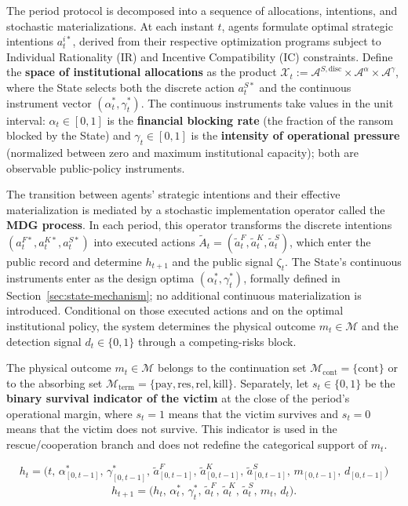 \documentclass[12pt,a4paper]{article}
\theoremstyle{plain}
\theoremstyle{definition}
\theoremstyle{remark}
\newcommand{\1}{\mathbf{1}}
\begin{document}
The period protocol is decomposed into a sequence of allocations, intentions, and
stochastic materializations. At each instant $t$, agents formulate optimal strategic
intentions $a_t^{i\ast}$, derived from their respective optimization programs subject
to Individual Rationality (IR) and Incentive Compatibility (IC) constraints. Define the
\textbf{space of institutional allocations} as the product
$\mathcal{X}_t:=\mathcal{A}^{S,\mathrm{disc}}\times\mathcal{A}^{\alpha}\times
\mathcal{A}^{\gamma}$, where the State selects both the discrete action
$a_t^{S\ast}$ and the continuous instrument vector
$(\alpha_t^\ast,\gamma_t^\ast)$. The continuous instruments take values in the unit
interval: $\alpha_t\in[0,1]$ is the \textbf{financial blocking rate} \textup{(the
fraction of the ransom blocked by the State)} and $\gamma_t\in[0,1]$ is the
\textbf{intensity of operational pressure} \textup{(normalized between zero and maximum
institutional capacity)}; both are observable public-policy instruments.

The transition between agents' strategic intentions and their effective materialization
is mediated by a stochastic implementation operator called the \textbf{MDG process}.
In each period, this operator transforms the discrete intentions
$(a_t^{F\ast},a_t^{K\ast},a_t^{S\ast})$ into executed actions
$\tilde{A}_t=(\tilde{a}_t^F,\tilde{a}_t^K,\tilde{a}_t^S)$, which enter the public
record and determine $h_{t+1}$ and the public signal $\zeta_t$. The State's continuous
instruments enter as the design optima $(\alpha_t^\ast,\gamma_t^\ast)$, formally
defined in Section~\ref{sec:state-mechanism}; no additional continuous materialization
is introduced. Conditional on those executed actions and on the optimal institutional
policy, the system determines the physical outcome $m_t\in\mathcal{M}$ and the
detection signal $d_t\in\{0,1\}$ through a competing-risks block.

The physical outcome $m_t\in\mathcal{M}$ belongs to the continuation set
$\mathcal{M}_{\mathrm{cont}}=\{\mathrm{cont}\}$ or to the absorbing set
$\mathcal{M}_{\mathrm{term}}=\{\mathrm{pay},\mathrm{res},\mathrm{rel},\mathrm{kill}\}$.
Separately, let $s_t\in\{0,1\}$ be the \textbf{binary survival indicator of the victim}
at the close of the period's operational margin, where $s_t=1$ means that the victim
survives and $s_t=0$ means that the victim does not survive. This indicator is used in
the rescue/cooperation branch and does not redefine the categorical support of $m_t$.

\begin{equation}
\label{eq:historia-publica}
h_t = \bigl(t,\, \alpha^\ast_{[0,t-1]},\, \gamma^\ast_{[0,t-1]},\,
\tilde{a}^F_{[0,t-1]},\, \tilde{a}^K_{[0,t-1]},\, \tilde{a}^S_{[0,t-1]},\,
m_{[0,t-1]},\, d_{[0,t-1]}\bigr)
\end{equation}
\begin{equation}
\label{eq:actualizacion-historia}
h_{t+1} = \bigl(h_t,\, \alpha_t^\ast,\, \gamma_t^\ast,\, \tilde{a}_t^F,\,
\tilde{a}_t^K,\, \tilde{a}_t^S,\, m_t,\, d_t\bigr).
\end{equation}
\end{document}
